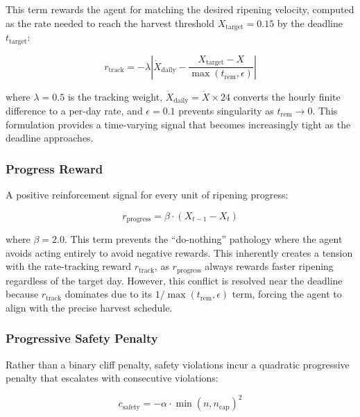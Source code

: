     This term rewards the agent for matching the desired ripening velocity, computed as the rate needed to reach the harvest threshold $X_{\text{target}} = 0.15$ by the deadline $t_{\text{target}}$:

    \begin{equation}
        r_{\text{track}} = -\lambda \left| \dot{X}_{\text{daily}} - \frac{X_{\text{target}} - X}{\max(t_{\text{rem}}, \epsilon)} \right|
        \label{eq:r_track}
    \end{equation}

    \noindent where $\lambda = 0.5$ is the tracking weight, $\dot{X}_{\text{daily}} = \dot{X} \times 24$ converts the hourly finite difference to a per-day rate, and $\epsilon = 0.1$ prevents singularity as $t_{\text{rem}} \to 0$. This formulation provides a time-varying signal that becomes increasingly tight as the deadline approaches.

    \subsubsection{Progress Reward}

    A positive reinforcement signal for every unit of ripening progress:

    \begin{equation}
        r_{\text{progress}} = \beta \cdot (X_{t-1} - X_t)
        \label{eq:r_progress}
    \end{equation}

    \noindent where $\beta = 2.0$. This term prevents the ``do-nothing'' pathology where the agent avoids acting entirely to avoid negative rewards. This inherently creates a tension with the rate-tracking reward $r_{\text{track}}$, as $r_{\text{progress}}$ always rewards faster ripening regardless of the target day. However, this conflict is resolved near the deadline because $r_{\text{track}}$ dominates due to its $1/\max(t_{\text{rem}}, \epsilon)$ term, forcing the agent to align with the precise harvest schedule.

    \subsubsection{Progressive Safety Penalty}

    Rather than a binary cliff penalty, safety violations incur a quadratic progressive penalty that escalates with consecutive violations:

    \begin{equation}
        c_{\text{safety}} = -\alpha \cdot \min(n, n_{\text{cap}})^2
        \label{eq:c_safety}
    \end{equation}

